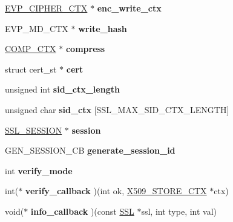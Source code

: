 \begin{DoxyCompactItemize}
\hyperlink{structevp__cipher__ctx__st}{E\+V\+P\+\_\+\+C\+I\+P\+H\+E\+R\+\_\+\+C\+TX} $\ast$ {\bfseries enc\+\_\+write\+\_\+ctx}
\item 
\mbox{\label{structssl__st_a491e1c0b9386b4003bb443af4a2d06d4}} 
E\+V\+P\+\_\+\+M\+D\+\_\+\+C\+TX $\ast$ {\bfseries write\+\_\+hash}
\item 
\mbox{\label{structssl__st_a62a49a9330502d045bbf6376c820225c}} 
\hyperlink{structcomp__ctx__st}{C\+O\+M\+P\+\_\+\+C\+TX} $\ast$ {\bfseries compress}
\item 
\mbox{\label{structssl__st_a335d212e807952601a0eabf4dfd978eb}} 
struct cert\+\_\+st $\ast$ {\bfseries cert}
\item 
\mbox{\label{structssl__st_a7b63f375f11b5232a5dff69e26f6a438}} 
unsigned int {\bfseries sid\+\_\+ctx\+\_\+length}
\item 
\mbox{\label{structssl__st_a486ddbf462473285440234c69568b9ce}} 
unsigned char {\bfseries sid\+\_\+ctx} \mbox{[}S\+S\+L\+\_\+\+M\+A\+X\+\_\+\+S\+I\+D\+\_\+\+C\+T\+X\+\_\+\+L\+E\+N\+G\+TH\mbox{]}
\item 
\mbox{\label{structssl__st_ae6d956c10b03dd3f4d0a3a132466eb47}} 
\hyperlink{structssl__session__st}{S\+S\+L\+\_\+\+S\+E\+S\+S\+I\+ON} $\ast$ {\bfseries session}
\item 
\mbox{\label{structssl__st_aa315242df1667bfb185bfcaa5b7ca86f}} 
G\+E\+N\+\_\+\+S\+E\+S\+S\+I\+O\+N\+\_\+\+CB {\bfseries generate\+\_\+session\+\_\+id}
\item 
\mbox{\label{structssl__st_a7592fd603fe469b789f13bdbc55a172e}} 
int {\bfseries verify\+\_\+mode}
\item 
\mbox{\label{structssl__st_a5891d1f44fd1385ae1c1c4e866450133}} 
int($\ast$ {\bfseries verify\+\_\+callback} )(int ok, \hyperlink{structx509__store__ctx__st}{X509\+\_\+\+S\+T\+O\+R\+E\+\_\+\+C\+TX} $\ast$ctx)
\item 
\mbox{\label{structssl__st_aaf32f29b307cfa33c4a19a7cf11bc36f}} 
void($\ast$ {\bfseries info\+\_\+callback} )(const \hyperlink{structssl__st}{S\+SL} $\ast$ssl, int type, int val)

\end{DoxyCompactItemize}
